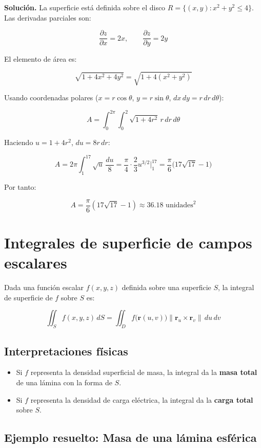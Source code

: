 \documentclass[
]{book}
\providecommand{\tightlist}{%
  \setlength{\itemsep}{0pt}\setlength{\parskip}{0pt}}
\begin{document}
\textbf{Solución.} La superficie está definida sobre el disco \(R = \{(x, y) : x^2 + y^2 \leq 4\}\). Las derivadas parciales son:

\[
\frac{\partial z}{\partial x} = 2x, \qquad \frac{\partial z}{\partial y} = 2y
\]

El elemento de área es:

\[
\sqrt{1 + 4x^2 + 4y^2} = \sqrt{1 + 4(x^2 + y^2)}
\]

Usando coordenadas polares (\(x = r\cos\theta\), \(y = r\sin\theta\), \(dx\,dy = r\,dr\,d\theta\)):

\[
A = \int_0^{2\pi} \int_0^2 \sqrt{1 + 4r^2} \, r\,dr\,d\theta
\]

Haciendo \(u = 1 + 4r^2\), \(du = 8r\,dr\):

\[
A = 2\pi \int_1^{17} \sqrt{u} \, \frac{du}{8} = \frac{\pi}{4} \cdot \frac{2}{3} u^{3/2} \Big|_1^{17} = \frac{\pi}{6} \bigl(17\sqrt{17} - 1\bigr)
\]

Por tanto:

\[
A = \frac{\pi}{6}(17\sqrt{17} - 1) \approx 36.18 \text{ unidades}^2
\]

\section{Integrales de superficie de campos escalares}\label{integrales-de-superficie-de-campos-escalares}

Dada una función escalar \(f(x, y, z)\) definida sobre una superficie \(S\), la integral de superficie de \(f\) sobre \(S\) es:

\[
\iint_S f(x, y, z) \, dS = \iint_D f\bigl(\mathbf{r}(u, v)\bigr) \|\mathbf{r}_u \times \mathbf{r}_v\| \, du\, dv
\]

\subsection{Interpretaciones físicas}\label{interpretaciones-fuxedsicas}

\begin{itemize}
\tightlist
\item
  Si \(f\) representa la densidad superficial de masa, la integral da la \textbf{masa total} de una lámina con la forma de \(S\).
\item
  Si \(f\) representa la densidad de carga eléctrica, la integral da la \textbf{carga total} sobre \(S\).
\end{itemize}

\subsection{Ejemplo resuelto: Masa de una lámina esférica}\label{ejemplo-resuelto-masa-de-una-luxe1mina-esfuxe9rica}
\end{document}
